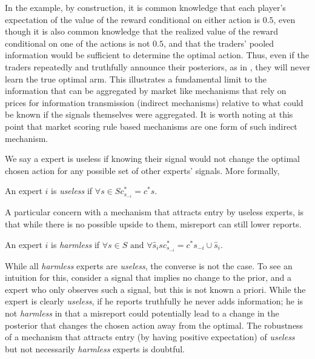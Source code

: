 In the example, by construction, it is common knowledge that each player's expectation of the value of the reward conditional on either action is $0.5$, even though it is also common knowledge that the realized value of the reward conditional on one of the actions is not $0.5$, and that the traders' pooled information would be sufficient to determine the optimal action. 
Thus, even if the traders repeatedly and truthfully announce their posteriors, as in \cite{geanakoplos1982we}, they will never learn the true optimal arm. 
This illustrates a fundamental limit to the information that can be aggregated by market like mechanisms that rely on prices for information transmission (indirect mechanisms) relative to what could be known if the signals themselves were aggregated. 
It is worth noting at this point that market scoring rule based mechanisms are one form of such indirect mechanism.


We say a expert is useless if knowing their signal would not change the optimal chosen action for any possible set of other experts' signals. More formally,

\begin{defn}\label{defn:useless}
	An expert $i$ is \emph{useless} if $\forall s  \in S c^{*}_{s_{-i}} = c^{*}{s}$.
\end{defn}

A particular concern with a mechanism that attracts entry by useless experts, is that while there is no possible upside to them, misreport can still lower reports.

\begin{defn}\label{defn:harmless}
	An expert $i$ is \emph{harmless} if $\forall s \in S \text{ and }\forall \hat{s}_i s c^{*}_{s_{-i}} = c^{*}{s_{-i} \cup \hat{s}_i}$.
\end{defn}

While all \emph{harmless} experts are \emph{useless}, the converse is not the case. To see an intuition for this, consider a signal that implies no change to the prior, and a expert who only observes such a signal, but this is not known a priori. While the expert is clearly \emph{useless}, if he reports truthfully he never adds information; he is not \emph{harmless} in that a misreport could potentially lead to a change in the posterior that changes the chosen action away from the optimal.
The robustness of a mechanism that attracts entry (by having positive expectation) of \emph{useless} but not necessarily \emph{harmless} experts is doubtful.

